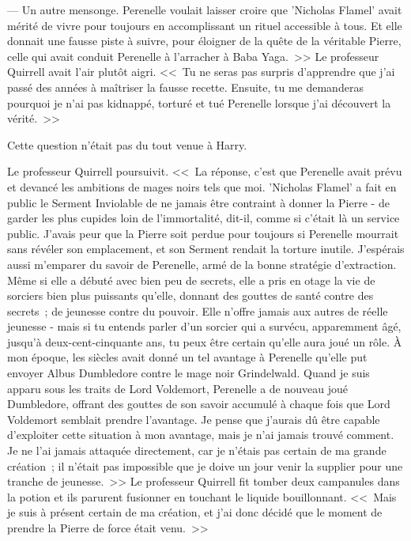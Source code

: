 --- Un autre mensonge. Perenelle voulait laisser croire que 'Nicholas Flamel' avait mérité de vivre pour toujours en accomplissant un rituel accessible à tous. Et elle donnait une fausse piste à suivre, pour éloigner de la quête de la véritable Pierre, celle qui avait conduit Perenelle à l'arracher à Baba Yaga.~>> Le professeur Quirrell avait l'air plutôt aigri. <<~Tu ne seras pas surpris d'apprendre que j'ai passé des années à maîtriser la fausse recette. Ensuite, tu me demanderas pourquoi je n'ai pas kidnappé, torturé et tué Perenelle lorsque j'ai découvert la vérité.~>>

Cette question n'était pas du tout venue à Harry.

Le professeur Quirrell poursuivit. <<~La réponse, c'est que Perenelle avait prévu et devancé les ambitions de mages noirs tels que moi. 'Nicholas Flamel' a fait en public le Serment Inviolable de ne jamais être contraint à donner la Pierre - de garder les plus cupides loin de l'immortalité, dit-il, comme si c'était là un service public. J'avais peur que la Pierre soit perdue pour toujours si Perenelle mourrait sans révéler son emplacement, et son Serment rendait la torture inutile. J'espérais aussi m'emparer du savoir de Perenelle, armé de la bonne stratégie d'extraction. Même si elle a débuté avec bien peu de secrets, elle a pris en otage la vie de sorciers bien plus puissants qu'elle, donnant des gouttes de santé contre des secrets~; de jeunesse contre du pouvoir. Elle n'offre jamais aux autres de réelle jeunesse - mais si tu entends parler d'un sorcier qui a survécu, apparemment âgé, jusqu'à deux-cent-cinquante ans, tu peux être certain qu'elle aura joué un rôle. À mon époque, les siècles avait donné un tel avantage à Perenelle qu'elle put envoyer Albus Dumbledore contre le mage noir Grindelwald. Quand je suis apparu sous les traits de Lord Voldemort, Perenelle a de nouveau joué Dumbledore, offrant des gouttes de son savoir accumulé à chaque fois que Lord Voldemort semblait prendre l'avantage. Je pense que j'aurais dû être capable d'exploiter cette situation à mon avantage, mais je n'ai jamais trouvé comment. Je ne l'ai jamais attaquée directement, car je n'étais pas certain de ma grande création~; il n'était pas impossible que je doive un jour venir la supplier pour une tranche de jeunesse.~>> Le professeur Quirrell fit tomber deux campanules dans la potion et ils parurent fusionner en touchant le liquide bouillonnant. <<~Mais je suis à présent certain de ma création, et j'ai donc décidé que le moment de prendre la Pierre de force était venu.~>>

